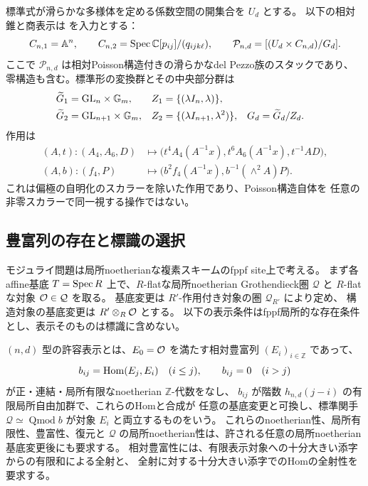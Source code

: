 標準式が滑らかな多様体を定める係数空間の開集合を $U_d$ とする。
以下の相対錐と商表示は \cite[定理7.3、定理8.8]{PoissonDP} を入力とする：
\[
 C_{n,1}=\mathbb A^n,\qquad
 C_{n,2}=\operatorname{Spec}\mathbb C[p_{ij}]/(q_{ijk\ell}),\qquad
 \mathcal P_{n,d}=[(U_d\times C_{n,d})/G_d].
\]
ここで $\mathcal P_{n,d}$ は相対Poisson構造付きの滑らかなdel Pezzo族のスタックであり、
零構造も含む。標準形の変換群とその中央部分群は
\begin{align*}
 \widetilde G_1&=\mathrm{GL}_n\times\mathbb G_m,
 &Z_1&=\{(\lambda I_n,\lambda)\},\\
 \widetilde G_2&=\mathrm{GL}_{n+1}\times\mathbb G_m,
 &Z_2&=\{(\lambda I_{n+1},\lambda^2)\},
 &G_d&=\widetilde G_d/Z_d.
\end{align*}
作用は
\begin{align*}
 (A,t)\colon (A_4,A_6,D)&\longmapsto
 \bigl(t^4A_4(A^{-1}x),t^6A_6(A^{-1}x),t^{-1}AD\bigr),\\
 (A,b)\colon (f_4,P)&\longmapsto
 \bigl(b^2f_4(A^{-1}x),b^{-1}(\wedge^2 A)P\bigr).
\end{align*}
これは偏極の自明化のスカラーを除いた作用であり、Poisson構造自体を
任意の非零スカラーで同一視する操作ではない。

\subsection{豊富列の存在と標識の選択}
モジュライ問題は局所noetherianな複素スキームのfppf site上で考える。
まず各affine基底 $T=\operatorname{Spec} R$ 上で、$R$-flatな局所noetherian Grothendieck圏
$\mathcal Q$ と $R$-flatな対象 $\mathcal O\in\mathcal Q$ を取る。
基底変更は $R'$-作用付き対象の圏 $\mathcal Q_{R'}$ により定め、
構造対象の基底変更は $R'\otimes_R\mathcal O$ とする。
以下の表示条件はfppf局所的な存在条件とし、表示そのものは標識に含めない。

\begin{definition}[豊富列型の許容表示]
\label{def:ample-model}
$(n,d)$ 型の許容表示とは、$E_0=\mathcal O$ を満たす相対豊富列
$(E_i)_{i\in\mathbb Z}$ であって、
\[
 b_{ij}=\operatorname{Hom}(E_j,E_i)\quad(i\le j),\qquad b_{ij}=0\quad(i>j)
\]
が正・連結・局所有限なnoetherian $\mathbb Z$-代数をなし、
$b_{ij}$ が階数 $h_{n,d}(j-i)$ の有限局所自由加群で、これらのHomと合成が
任意の基底変更と可換し、標準関手
$\mathcal Q\simeq\operatorname{Qmod}b$ が対象 $E_i$ と両立するものをいう。
これらのnoetherian性、局所有限性、豊富性、復元と
$\mathcal Q$ の局所noetherian性は、許される任意の局所noetherian基底変更後にも要求する。
相対豊富性には、有限表示対象への十分大きい添字からの有限和による全射と、
全射に対する十分大きい添字でのHomの全射性を要求する。
\end{definition}


